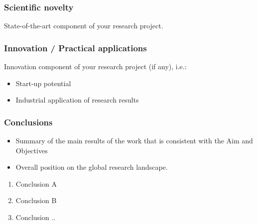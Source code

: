 \documentclass[aspectratio=169]{beamer}
\begin{document}


\begin{frame}
    \frametitle{Scientific novelty}
    
    
    State-of-the-art component of your research project.

\end{frame}



\begin{frame}
    \frametitle{Innovation / Practical applications}
    
    
    Innovation component of your research project (if any), i.e.:
        \begin{itemize}
            \item Start-up potential 
            \item Industrial application of research results
        \end{itemize}

\end{frame} 




\begin{frame}
    \frametitle{Conclusions}
    
    \begin{itemize}
        \item Summary of the main results of the work that is consistent with the Aim and Objectives
        \item Overall position on the global research landscape.
        \newline
    \end{itemize}  
    
    \begin{enumerate}
        \item Conclusion A
        \item Conclusion B
        \item Conclusion ..
    \end{enumerate}
\end{frame}
\end{document}
